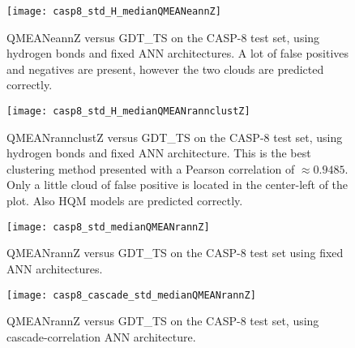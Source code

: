 \begin{figure}[H]
	\begin{center}
		\texttt{[image: casp8\_std\_H\_medianQMEANeannZ]}
		\caption[QMEANeannZ versus GDT\_TS on the CASP-8 test set, using hydrogen bonds and fixed ANN architectures]{QMEANeannZ versus GDT\_TS on the CASP-8 test set, using hydrogen bonds and fixed ANN architectures. A lot of false positives and negatives are present, however the two clouds are predicted correctly.}
		\label{fig:casp8_std_H_median_qmeaneannZ}
	\end{center}
\end{figure}

\begin{figure}[H]
	\begin{center}
		\texttt{[image: casp8\_std\_H\_medianQMEANrannclustZ]}
		\caption[QMEANrannclustZ versus GDT\_TS on the CASP-8 test set, using hydrogen bonds and fixed ANN architecture]{QMEANrannclustZ versus GDT\_TS on the CASP-8 test set, using hydrogen bonds and fixed ANN architecture. This is the best clustering method presented with a Pearson correlation of $\approx 0.9485$. Only a little cloud of false positive is located in the center-left of the plot. Also HQM models are predicted correctly.}
		\label{fig:casp8_std_H_median_qmeanrannclustZ}
	\end{center}
\end{figure}

\begin{figure}[H]
	\begin{center}
		\texttt{[image: casp8\_std\_medianQMEANrannZ]}
		\caption[QMEANrannZ versus GDT\_TS on the CASP-8 test set using fixed ANN architecture]{QMEANrannZ versus GDT\_TS on the CASP-8 test set using fixed ANN architectures.}
		\label{fig:casp8_std_median_qmeanrannZ}
	\end{center}
\end{figure}

\begin{figure}[H]
	\begin{center}
		\texttt{[image: casp8\_cascade\_std\_medianQMEANrannZ]}
		\caption[QMEANrannZ versus GDT\_TS on the CASP-8 test set, using ca\-sca\-de-\-cor\-re\-la\-tion ANN architecture]{QMEANrannZ versus GDT\_TS on the CASP-8 test set, using ca\-sca\-de-\-cor\-re\-la\-tion ANN architecture.}
		\label{fig:casp8_cascade_std_median_qmeanrannZ}
	\end{center}
\end{figure}

